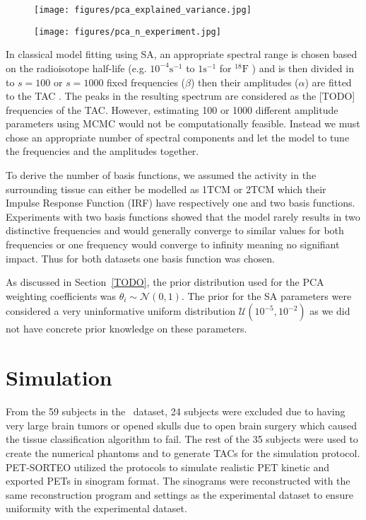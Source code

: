 \begin{figure}[t]
	\centering
	\texttt{[image: figures/pca\_explained\_variance.jpg]}
	\caption{}
\end{figure}
\begin{figure}[t]
	\centering
	\texttt{[image: figures/pca\_n\_experiment.jpg]}
	\caption{}
\end{figure}

In classical model fitting using SA, an appropriate spectral range is chosen based on the radioisotope half-life (e.g. $10^{-4} \mathrm{s}^{-1}$ to $1 \mathrm{s}^{-1}$ for $^{18}\mathrm{F}$ ) and is then divided in to $s=100$ or $s=1000$ fixed frequencies ($\beta$) then their amplitudes ($\alpha$) are fitted to the TAC \cite{TODO}.
The peaks in the resulting spectrum are considered as the [TODO] frequencies of the TAC.
However, estimating 100 or 1000 different amplitude parameters using MCMC would not be computationally feasible.
Instead we must chose an appropriate number of spectral components and let the model to tune the frequencies and the amplitudes together.

To derive the number of basis functions, we assumed the activity in the surrounding tissue can either be modelled as 1TCM or 2TCM which their Impulse Response Function (IRF) have respectively one and two basis functions.
Experiments with two basis functions showed that the model rarely results in two distinctive frequencies and would generally converge to similar values for both frequencies or one frequency would converge to infinity meaning no signifiant impact.
Thus for both datasets one basis function was chosen.

As discussed in Section~\ref{TODO}, the prior distribution used for the PCA weighting coefficients was $\theta_i \sim \mathcal{N}(0,1)$.
The prior for the SA parameters were considered a very uninformative uniform distribution $\mathcal{U}(10^{-5},10^{-2})$ as we did not have concrete prior knowledge on these parameters.


\section{Simulation}
From the 59 subjects in the \fdg $\,$ dataset, 24 subjects were excluded due to having very large brain tumors or opened skulls due to open brain surgery which caused the tissue classification algorithm to fail.
The rest of the 35 subjects were used to create the numerical phantoms and to generate TACs for the simulation protocol.
PET-SORTEO utilized the protocols to simulate realistic PET kinetic and exported PETs in sinogram format.
The sinograms were reconstructed with the same reconstruction program and settings as the experimental dataset to ensure uniformity with the experimental dataset.

